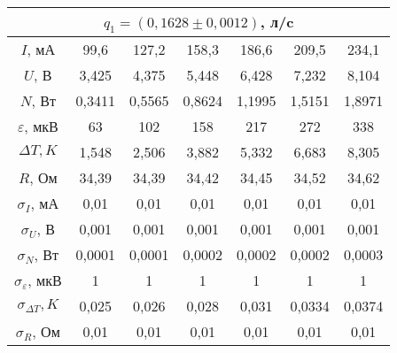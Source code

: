 \documentclass[a4paper,12pt]{article}
\begin{document}
\begin{enumerate}
\begin{center}
			
			\begin{tabular}{|c|c|c|c|c|c|c|}
				\hline
				\multicolumn{7}{|c|}{$q_1 = (0,1628 \pm 0,0012)$, л/c} \\ \hline
				$I$, мА 			& 99,6 		& 127,2 	& 158,3  	& 186,6  & 209,5  	& 234,1  \\ \hline
				$U$, В 				& 3,425	 	& 4,375 	& 5,448  	& 6,428  & 7,232  	& 8,104  \\ \hline
				$N$, Вт 			& 0,3411	& 0,5565 	& 0,8624 	& 1,1995 & 1,5151 	& 1,8971 \\ \hline
				$\varepsilon$, мкВ 	& 63 		& 102		& 158 		& 217 	 & 272 		& 338 	 \\ \hline
				$\Delta T, K$ 		& 1,548 	& 2,506		& 3,882	 	& 5,332  & 6,683	& 8,305  \\ \hline
				$R$, Ом 			& 34,39 	& 34,39		& 34,42	 	& 34,45  & 34,52 	& 34,62	 \\ \hline
				$\sigma_I$, мА 				& 0,01 	 & 0,01   	& 0,01 		& 0,01	 & 0,01		& 0,01	\\ \hline
				$\sigma_U$, В 				& 0,001  & 0,001  	& 0,001 	& 0,001  & 0,001 	& 0,001 \\ \hline
				$\sigma_N$, Вт 				& 0,0001 & 0,0001 	& 0,0002 	& 0,0002 & 0,0002 	& 0,0003 \\ \hline
				$\sigma_\varepsilon$, мкВ 	& 1 	 & 1 	  	& 1 		& 1 	 & 1 		& 1\\ \hline
				$\sigma_{\Delta T}, K$ 		& 0,025	 & 0,026	& 0,028 	& 0,031	 & 0,0334	& 0,0374 \\ \hline
				$\sigma_R$, Ом 				& 0,01 	 & 0,01 	& 0,01 		& 0,01	 & 0,01 	& 0,01 \\ \hline
			\end{tabular}
			\\ \phantom{Ящеры} \\
			

\end{center}
\end{enumerate}
\end{document}
